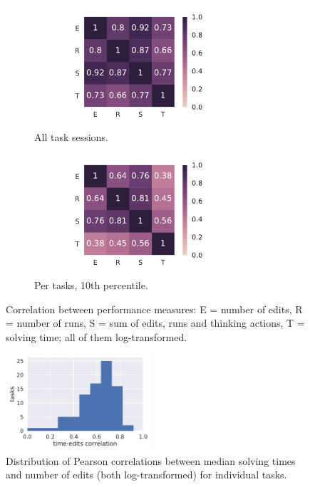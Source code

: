 \begin{figure}[htb]
\centering
\begin{subfigure}{.49\textwidth}
\centering
\includegraphics[height=45mm,trim={34mm 0 11mm 0},clip]{img/performance-corr-ts}
\caption{All task sessions.}
\label{fig:performance-corrs-ts}
\end{subfigure}
\begin{subfigure}{.49\textwidth}
\centering
\includegraphics[height=45mm,trim={34mm 0 11mm 0},clip]{img/performance-corr-tasks-q10}
\caption{Per tasks, 10th percentile.}
\label{fig:performance-corrs-p10}
\end{subfigure}
\caption{Correlation between performance measures:
E = number of edits, R = number of runs, S = sum of edits, runs and thinking actions,
T = solving time; all of them log-transformed.}
\label{fig:performance-corrs}
\end{figure}


\begin{figure}[htb]
\centering
\includegraphics[width=0.48\textwidth]{img/time-edits-corr}
\caption{%
  Distribution of Pearson correlations between median solving times and number
  of edits (both log-transformed) for individual tasks.} %
\label{fig:time-vs-edits}
\end{figure}


